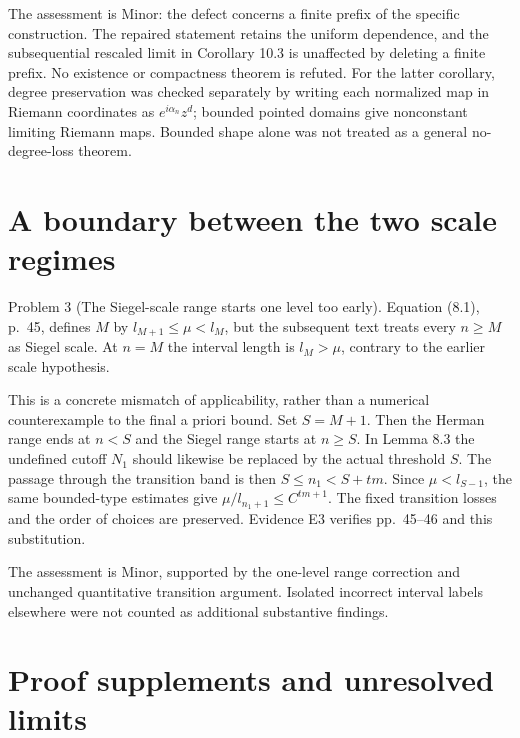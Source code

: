 \documentclass[10pt]{article}
\begin{document}
The assessment is Minor: the defect concerns a finite prefix of the specific construction. The repaired statement retains the uniform dependence, and the subsequential rescaled limit in Corollary 10.3 is unaffected by deleting a finite prefix. No existence or compactness theorem is refuted. For the latter corollary, degree preservation was checked separately by writing each normalized map in Riemann coordinates as \(e^{i\alpha_n}z^d\); bounded pointed domains give nonconstant limiting Riemann maps. Bounded shape alone was not treated as a general no-degree-loss theorem.\par
\section*{A boundary between the two scale regimes}
Problem 3 (The Siegel-scale range starts one level too early).  Equation (8.1), p. 45, defines \(M\) by \(l_{M+1}\leq\mu<l_M\), but the subsequent text treats every \(n\geq M\) as Siegel scale. At \(n=M\) the interval length is \(l_M>\mu\), contrary to the earlier scale hypothesis.\par
This is a concrete mismatch of applicability, rather than a numerical counterexample to the final a priori bound. Set \(S=M+1\). Then the Herman range ends at \(n<S\) and the Siegel range starts at \(n\geq S\). In Lemma 8.3 the undefined cutoff \(N_1\) should likewise be replaced by the actual threshold \(S\). The passage through the transition band is then \(S\leq n_1<S+tm\). Since \(\mu<l_{S-1}\), the same bounded-type estimates give \(\mu/l_{n_1+1}\leq C^{tm+1}\). The fixed transition losses and the order of choices are preserved. Evidence E3 verifies pp. 45–46 and this substitution.\par
The assessment is Minor, supported by the one-level range correction and unchanged quantitative transition argument. Isolated incorrect interval labels elsewhere were not counted as additional substantive findings.\par
\section*{Proof supplements and unresolved limits}
\end{document}
